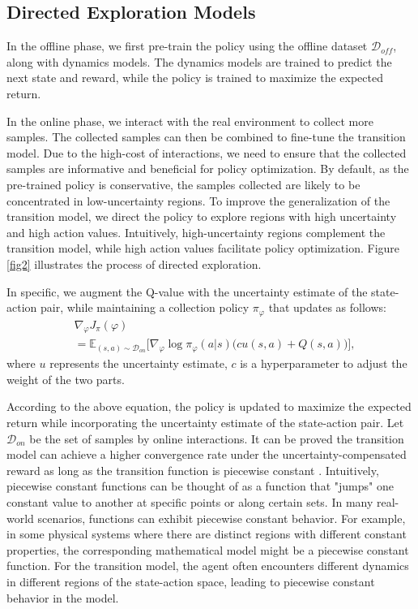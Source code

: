 \documentclass[conference]{IEEEtran}
\begin{document}
\subsection{Directed Exploration Models}
In the offline phase, we first pre-train the policy using the offline dataset \( \mathcal{D}_{off} \), along with dynamics models. The dynamics models are trained to predict the next state and reward, while the policy is trained to maximize the expected return.

In the online phase, we interact with the real environment to collect more samples. The collected samples can then be combined to fine-tune the transition model. Due to the high-cost of interactions, we need to ensure that the collected samples are informative and beneficial for policy optimization. By default, as the pre-trained policy is conservative, the samples collected are likely to be concentrated in low-uncertainty regions. To improve the generalization of the transition model, we direct the policy to explore regions with high uncertainty and high action values. Intuitively, high-uncertainty regions complement the transition model, while high action values facilitate policy optimization. Figure \ref{fig2} illustrates the process of directed exploration.

In specific, we augment the Q-value with the uncertainty estimate of the state-action pair, while
maintaining a collection policy $\pi_{\varphi}$ that updates as follows:
%
\begin{equation}
\begin{aligned}
  &\nabla_{\varphi}J_{\pi}(\varphi) \\
  &= \mathbb{E}_{(s,a)\sim \mathcal{D}_{on}} \Big[ \nabla_{\varphi}\log \pi_\varphi(a|s) \big( cu(s,a) + Q(s,a) \big) \Big],
\label{equa3}
\end{aligned}
\end{equation}%
where \( u \) represents the uncertainty estimate, \( c \) is a hyperparameter to adjust the weight of the two parts.

According to the above equation, the policy is updated to maximize the expected return while incorporating the uncertainty estimate of the state-action pair. Let $\mathcal{D}_{on}$ be the set of samples by online interactions. It can be proved the transition model can achieve a higher convergence rate under the uncertainty-compensated reward as long as the transition function is piecewise constant \cite{willett2005faster}. Intuitively, piecewise constant functions can be thought of as a function that "jumps" one constant value to another at specific points or along certain sets. In many real-world scenarios, functions can exhibit piecewise constant behavior. For example, in some physical systems where there are distinct regions with different constant properties, the corresponding mathematical model might be a piecewise constant function. For the transition model, the agent often encounters different dynamics in different regions of the state-action space, leading to piecewise constant behavior in the model.
\end{document}
